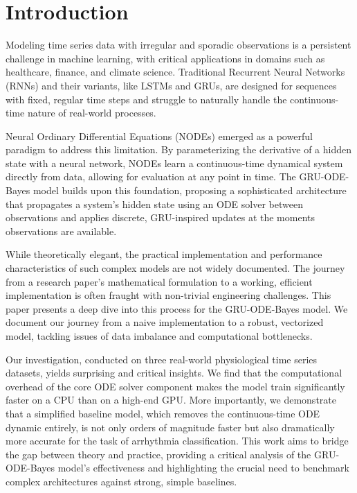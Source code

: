 \section{Introduction}
\label{sec:introduction}

Modeling time series data with irregular and sporadic observations is a 
persistent challenge in machine learning, with critical applications in domains such as healthcare, 
finance, and climate science. 
Traditional Recurrent Neural Networks (RNNs) and their variants, 
like LSTMs and GRUs, are designed for sequences with fixed, 
regular time steps and struggle to naturally handle the continuous-time nature of 
real-world processes.

Neural Ordinary Differential Equations (NODEs) \cite{chen2019neuralordinarydifferentialequations} 
emerged as a powerful paradigm to address this limitation. 
By parameterizing the derivative of a hidden state with a neural network, NODEs learn a continuous-time dynamical 
system directly from data, allowing for evaluation at any point in time. 
The GRU-ODE-Bayes model \cite{debrouwer2019gruodebayescontinuousmodelingsporadicallyobserved} 
builds upon this foundation, proposing a sophisticated architecture that propagates a system's 
hidden state using an ODE solver between observations and applies discrete, 
GRU-inspired updates at the moments observations are available.

While theoretically elegant, the practical implementation and performance characteristics of such 
complex models are not widely documented. 
The journey from a research paper's mathematical formulation to a working, efficient implementation is often 
fraught with non-trivial engineering challenges. 
This paper presents a deep dive into this process for the GRU-ODE-Bayes model. 
We document our journey from a naive implementation to a robust, vectorized model, 
tackling issues of data imbalance and computational bottlenecks.

Our investigation, conducted on three real-world physiological time series datasets, yields surprising and critical insights.
We find that the computational overhead of the core ODE solver component makes the model train significantly 
faster on a CPU than on a high-end GPU. 
More importantly, we demonstrate that a simplified baseline model, which removes the continuous-time ODE dynamic 
entirely, is not only orders of magnitude faster but also dramatically more accurate for the task of arrhythmia classification. 
This work aims to bridge the gap between theory and practice, providing a critical analysis of the GRU-ODE-Bayes
model's effectiveness and highlighting the crucial need to benchmark complex architectures
against strong, simple baselines.